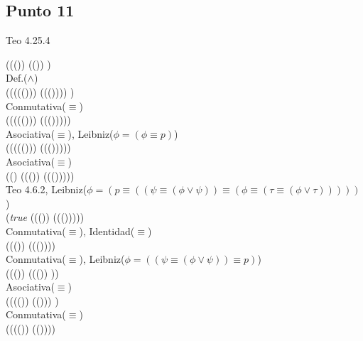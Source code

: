 \documentclass{article}
\begin{document}
\subsection{Punto 11}
\begin{logicenv}{Teo 4.25.4}
    \begin{derivation}
            (((\phi \land \psi)) \equiv ((\phi \land \tau)) \equiv \phi)\\
        Def.($\land$)\\
            (((\phi \equiv (\psi \equiv (\phi \lor \psi))) \equiv (\phi \equiv (\tau \equiv (\phi \lor \tau)))) \equiv \phi)\\
        Conmutativa($\equiv$)\\
            (\phi \equiv ((\phi \equiv (\psi \equiv (\phi \lor \psi))) \equiv (\phi \equiv (\tau \equiv (\phi \lor \tau)))))\\
        Asociativa($\equiv$), Leibniz($\phi = (\phi \equiv p)$)\\
            (\phi \equiv (\phi \equiv ((\psi \equiv (\phi \lor \psi))) \equiv (\phi \equiv (\tau \equiv (\phi \lor \tau)))))\\
        Asociativa($\equiv$)\\
            ((\phi \equiv \phi) \equiv ((\psi \equiv (\phi \lor \psi)) \equiv (\phi \equiv (\tau \equiv (\phi \lor \tau)))))\\
        Teo 4.6.2, Leibniz($\phi = (p \equiv ((\psi \equiv (\phi \lor \psi)) \equiv (\phi \equiv (\tau \equiv (\phi \lor \tau)))))$)\\
            (\textrm{\textit{true}} \equiv ((\psi \equiv (\phi \lor \psi)) \equiv (\phi \equiv (\tau \equiv (\phi \lor \tau)))))\\
        Conmutativa($\equiv$), Identidad($\equiv$)\\
            ((\psi \equiv (\phi \lor \psi)) \equiv (\phi \equiv (\tau \equiv (\phi \lor \tau))))\\
        Conmutativa($\equiv$), Leibniz($\phi = ((\psi \equiv (\phi \lor \psi)) \equiv p)$)\\
            ((\psi \equiv (\phi \lor \psi)) \equiv ((\tau \equiv (\phi \lor \psi)) \equiv \phi))\\
        Asociativa($\equiv$)\\
            (((\psi \equiv (\phi \lor \psi)) \equiv (\tau \equiv (\phi \lor \psi))) \equiv \phi)\\
        Conmutativa($\equiv$)\\
            (\phi \equiv ((\psi \equiv (\phi \lor \psi)) \equiv (\tau \equiv (\phi \lor \psi))))\\

\end{derivation}
\end{logicenv}
\end{document}

